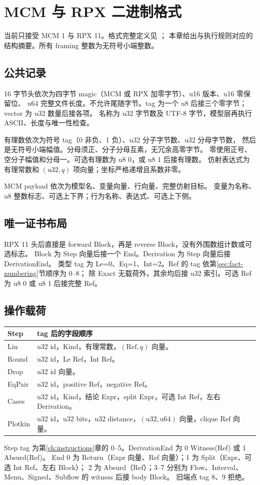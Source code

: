 \chapter{MCM 与 RPX 二进制格式}
\label{ch:format}

当前只接受 MCM 1 与 RPX 11。格式完整定义见 ；
本章给出与执行规则对应的结构摘要。所有 framing 整数为无符号小端整数。

\section{公共记录}
16 字节头依次为四字节 magic（MCM 或 RPX 加零字节）、u16 版本、u16 零保留位、
u64 完整文件长度。不允许尾随字节。tag 为一个 u8 后接三个零字节；vector 为 u32 数量后接各项。
名称为 u32 字节数及 UTF-8 字节，模型层再执行 ASCII、长度与唯一性检查。

有理数依次为符号 tag（0 非负、1 负）、u32 分子字节数、u32 分母字节数，
然后是无符号小端幅值。分母须正、分子分母互素，无冗余高零字节。
零使用正号、空分子幅值和分母一。可选有理数为 u8 0，或 u8 1 后接有理数。
仿射表达式为有理常数和 $(\mathrm{u32},q)$ 项向量；坐标严格递增且系数非零。

MCM payload 依次为模型名、变量向量、行向量、完整仿射目标。
变量为名称、u8 整数标志、可选上下界；行为名称、表达式、可选上下侧。

\section{唯一证书布局}
RPX 11 头后直接是 forward Block，再是 reverse Block，没有外围数组计数或可选标志。
Block 为 Step 向量后接一个 End。Derivation 为 Step 向量后接 DerivationEnd。
类型 tag 为 Le=0、Eq=1、Int=2。Ref 的 tag 依第\ref{sec:fact-numbering}节顺序为 0--8；
除 Exact 无载荷外，其余均后接 u32 索引。可选 Ref 为 u8 0 或 u8 1 后接完整 Ref。

\section{操作载荷}
\begin{longtable}{lp{}}
\toprule Step & tag 后的字段顺序\\\midrule\endhead
Lin & u32 id，Kind，有理常数，$(\mathrm{Ref},q)$ 向量。\\
Round & u32 id，Le Ref，Int Ref。\\
Drop & u32 id 向量。\\
EqPair & u32 id，positive Ref，negative Ref。\\
Cases & u32 id，Kind，结论 Expr，split Expr，可选 Int Ref，左右 Derivation。\\
Plotkin & u32 id，u32 bits，u32 distance，$(\mathrm{u32},\mathrm{u64})$ 向量，clique Ref 向量。\\
\bottomrule
\end{longtable}
Step tag 为第\ref{ch:instructions}章的 0--5。DerivationEnd 为 0 Witness(Ref) 或 1 Absurd(Ref)。
End 0 为 Return（Expr 向量、Ref 向量）；1 为 Split（Expr、可选 Int Ref、左右 Block）；
2 为 Absurd（Ref）；3--7 分别为 Flow、Interval、Menu、Signed、Subflow 的 witness 后接 body Block。
旧端点 tag 8、9 拒绝。

